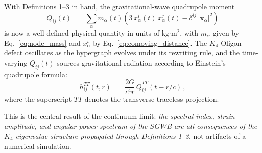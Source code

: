With Definitions 1--3 in hand, the gravitational-wave quadrupole moment
\begin{equation}
    Q_{ij}(t) \;=\; \sum_\alpha m_\alpha(t) \left(3\, x_\alpha^i(t)\, x_\alpha^j(t) - \delta^{ij}\, |\mathbf{x}_\alpha|^2\right)
    \label{eq:quadrupole}
\end{equation}
is now a well-defined physical quantity in units of kg$\cdot$m$^2$, with $m_\alpha$ given by Eq.~\eqref{eq:node_mass} and $x_\alpha^i$ by Eq.~\eqref{eq:comoving_distance}.  The $K_4$ Oligon defect oscillates as the hypergraph evolves under its rewriting rule, and the time-varying $Q_{ij}(t)$ sources gravitational radiation according to Einstein's quadrupole formula:
\begin{equation}
    h_{ij}^{TT}(t, r) \;=\; \frac{2G}{c^4 r}\, \ddot{Q}_{ij}^{TT}(t - r/c)\,,
    \label{eq:einstein_quadrupole}
\end{equation}
where the superscript $TT$ denotes the transverse-traceless projection.

This is the central result of the continuum limit: \emph{the spectral index, strain amplitude, and angular power spectrum of the SGWB are all consequences of the $K_4$ eigenvalue structure propagated through Definitions 1--3}, not artifacts of a numerical simulation.
